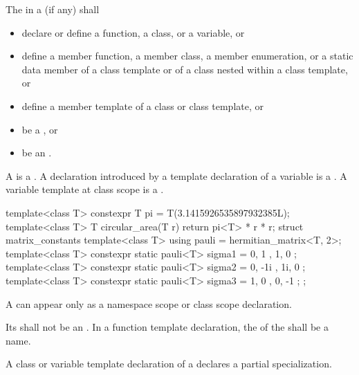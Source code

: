 \pnum
The
in a
(if any)
shall
\begin{itemize}
\item declare or define a function, a class, or a variable, or

\item define a member function, a member class, a member enumeration, or a static data member of a
class template or of a class nested within a class template, or

\item define a member template of a class or class template, or

\item be a , or

\item be an .
\end{itemize}

\pnum
A  is a .
A declaration introduced by a template declaration of a
%
variable is a . A variable template at class scope is a
.

\begin{example}
\begin{codeblock}
template<class T>
  constexpr T pi = T(3.1415926535897932385L);
template<class T>
  T circular_area(T r) {
    return pi<T> * r * r;
  }
struct matrix_constants {
  template<class T>
    using pauli = hermitian_matrix<T, 2>;
  template<class T>
    constexpr static pauli<T> sigma1 = { { 0, 1 }, { 1, 0 } };
  template<class T>
    constexpr static pauli<T> sigma2 = { { 0, -1i }, { 1i, 0 } };
  template<class T>
    constexpr static pauli<T> sigma3 = { { 1, 0 }, { 0, -1 } };
};
\end{codeblock}
\end{example}

\pnum
\begin{note}
A 
can appear only as a namespace scope or class scope declaration.
\end{note}
Its  shall not be an
.
In a function template declaration, the  of the
 shall be a name.
\begin{note}
A class or variable template declaration of a 
declares a partial specialization.
\end{note}

